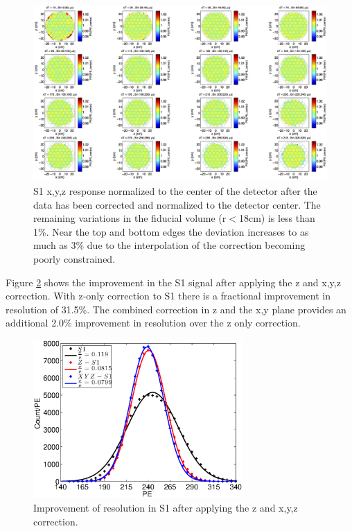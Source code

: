 \renewcommand{\baselinestretch}{1}
\small\normalsize
\begin{figure}\centering
\includegraphics[width=220mm]{Chapter_XYZ_Corr/Thesis_Corr_Plots/S1_XYZ_Kr_FlatField_norm_center_crop.png}
\caption{S1 x,y,z response normalized to the center of the detector after the data has been corrected and normalized to the detector center. The remaining variations in the fiducial volume (r$<$18cm) is less than 1\%. Near the top and bottom edges the deviation increases to as much as 3\% due to the interpolation of the correction becoming poorly constrained.}
\label{fig:S1_XYZ_norm_center}
\end{figure}
\renewcommand{\baselinestretch}{2}
\small\normalsize


Figure \ref{fig:S1_res} shows the improvement in the S1 signal after applying the z and x,y,z correction. With z-only correction to S1 there is a fractional improvement in resolution of 31.5\%. The combined correction in z and the x,y plane provides an additional 2.0\% improvement in resolution over the z only correction.

\begin{figure}[h!]\centering
\includegraphics[width=80mm]{Chapter_XYZ_Corr/Thesis_Corr_Plots/S1_corr_res.eps}
\caption{Improvement of resolution in S1 after applying the z and x,y,z correction. }
\label{fig:S1_res}
\end{figure}

